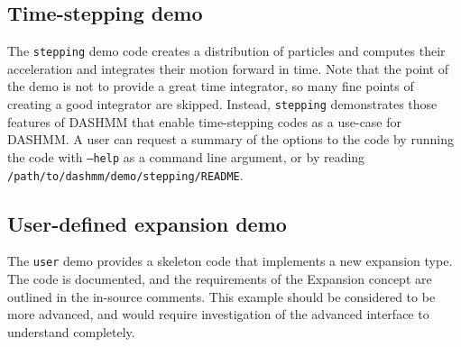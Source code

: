 \subsection{Time-stepping demo}
The {\tt stepping} demo code creates a distribution of particles and
computes their acceleration and integrates their motion forward in
time. Note that the point of the demo is not to provide a great time
integrator, so many fine points of creating a good integrator are
skipped. Instead, {\tt stepping} demonstrates those features of DASHMM
that enable time-stepping codes as a use-case for DASHMM. A user can
request a summary of the options to the code by running the code with
{\tt --help} as a command line argument, or by reading {\tt
  /path/to/dashmm/demo/stepping/README}.

\subsection{User-defined expansion demo}

The {\tt user} demo provides a skeleton code that implements a new
expansion type. The code is documented, and the requirements of the
Expansion concept are outlined in the in-source comments. This example
should be considered to be more advanced, and would require
investigation of the advanced interface to understand completely.